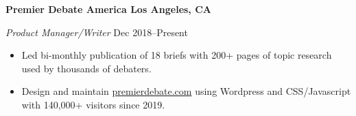 \textbf{Premier Debate America \hfill  Los Angeles, CA} \par
\textit{Product Manager/Writer} \hfill Dec 2018--Present \par
\begin{itemize}
	\item Led bi-monthly publication of 18 briefs with 200+ pages of topic research used by thousands of debaters.
	\item Design and maintain \href{https://www.premierdebate.com/briefs/}{premierdebate.com} using Wordpress and CSS/Javascript with 140,000+ visitors since 2019.
\end{itemize} \par
